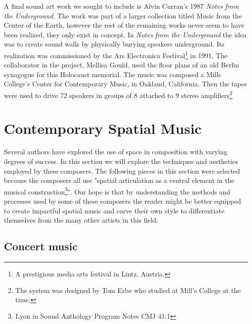 A final sound art work we sought to include is Alvin Curran's 1987 \textit{Notes from the Underground}. The work was part of a larger collection titled Music from the Center of the Earth, however the rest of the remaining works never seem to have been realized, they only exist in concept. In \textit{Notes from the Underground} the idea was to create sound walls by physically burying speakers underground. Its realization was commissioned by the Ars Electronica Festival\footnote{A prestigious media arts festival in Lintz, Austria.} in 1991. The collaborator in the project, Mellisa Gould, used the floor plans of an old Berlin synagogue for this Holocaust memorial. The music was composed a Mills College's Center for Contemporary Music, in Oakland, California. Then the tapes were used to drive 72 speakers in groups of 8 attached to 9 stereo amplifiers\cite{curran1994music}\footnote{The system was designed by Tom Erbe who studied at Mill's College at the time.}


\section{Contemporary Spatial Music} \label{sec:contemp_works}

Several authors have explored the use of space in composition with varying degrees of success. In this section we will explore the techniques and aesthetics employed by these composers. The following pieces in this section were selected because the composers all use "spatial articulation as a central element in the musical construction\footnote{Lyon in Sound Anthology Program Notes CMJ 41:1}". Our hope is that by understanding the methods and processes used by some of these composers the reader might be better equipped to create impactful spatial music and carve their own style to differentiate themselves from the many other artists in this field. 

\subsection{Concert music}

